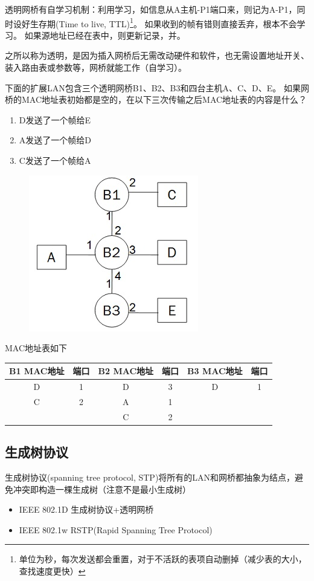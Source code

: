 透明网桥有自学习机制：利用学习，如信息从A主机-P1端口来，则记为A-P1，同时设好生存期(Time to live, TTL)\footnote{单位为秒，每次发送都会重置，对于不活跃的表项自动删掉（减少表的大小，查找速度更快）}。
如果收到的帧有错则直接丢弃，根本不会学习。
如果源地址已经在表中，则更新记录，并。

之所以称为透明，是因为插入网桥后无需改动硬件和软件，也无需设置地址开关、装入路由表或参数等，网桥就能工作（自学习）。

\begin{example}
	下面的扩展LAN包含三个透明网桥B1、B2、B3和四台主机A、C、D、E。
	如果网桥的MAC地址表初始都是空的，在以下三次传输之后MAC地址表的内容是什么？
	\begin{enumerate}
	\item D发送了一个帧给E
	\item A发送了一个帧给D
	\item C发送了一个帧给A
	\end{enumerate}
	\begin{figure}[H]
		\centering
		\includegraphics[width=0.25\linewidth]{fig/mac_address.jpg}
	\end{figure}
\end{example}
\begin{analysis}
	MAC地址表如下
	\begin{center}
		\begin{tabular}{cc|cc|cc}\hline
			B1 MAC地址 & 端口 & B2 MAC地址 & 端口 & B3 MAC地址 & 端口\\\hline
			D & 1 & D & 3 & D & 1\\
			C & 2 & A & 1 & & \\
			& & C & 2 & & \\\hline
		\end{tabular}
	\end{center}
\end{analysis}

\subsection{生成树协议}
生成树协议(spanning tree protocol, STP)将所有的LAN和网桥都抽象为结点，避免冲突即构造一棵生成树（注意不是最小生成树）
\begin{itemize}
\item IEEE 802.1D 生成树协议+透明网桥
\item IEEE 802.1w RSTP(Rapid Spanning Tree Protocol)
\end{itemize}

